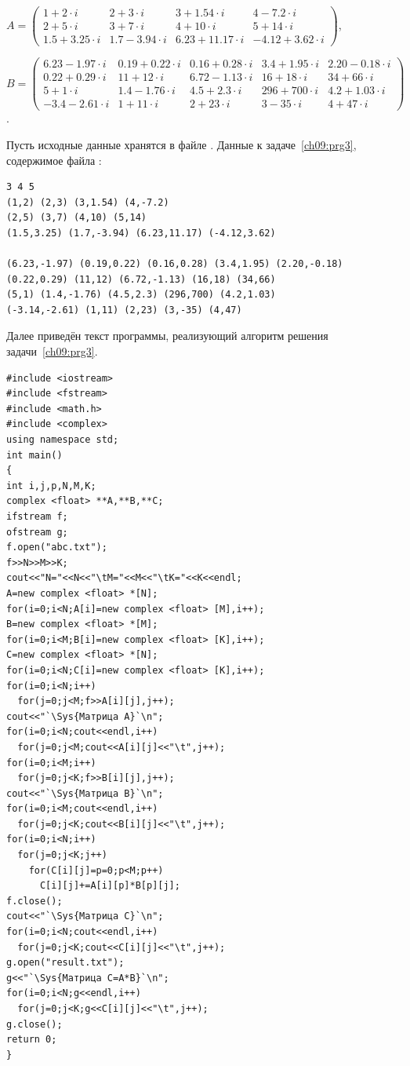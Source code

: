 {\noindent\scriptsize
$A=\left(\begin{array}{rrrr}1+2\cdot i&2+3\cdot i&3+1.54\cdot i&4-7.2\cdot i\\2+5\cdot i&3+7\cdot i&4+10\cdot i&5+14\cdot
i\\1.5+3.25\cdot i&1.7-3.94\cdot i&6.23+11.17\cdot i&-4.12+3.62\cdot i\end{array}\right)$,

\noindent $B=\left(\begin{array}{rrrrr}6.23-1.97\cdot i&0.19+0.22\cdot i&0.16+0.28\cdot i&3.4+1.95\cdot i&2.20-0.18\cdot
i\\0.22+0.29\cdot i&11+12\cdot i&6.72-1.13\cdot i&16+18\cdot i&34+66\cdot i\\5+1\cdot i&1.4-1.76\cdot i&4.5+2.3\cdot
i&296+700\cdot i&4.2+1.03\cdot i\\-3.4-2.61\cdot i&1+11\cdot i&2+23\cdot i&3-35\cdot i&4+47\cdot i\end{array}\right)$.
}

Пусть исходные данные хранятся в файле . %
Данные к задаче~\ref{ch09:prg3}\label{ch09:file0}, содержимое файла :
\begin{verbatim}
3 4 5
(1,2) (2,3) (3,1.54) (4,-7.2)
(2,5) (3,7) (4,10) (5,14)
(1.5,3.25) (1.7,-3.94) (6.23,11.17) (-4.12,3.62)

(6.23,-1.97) (0.19,0.22) (0.16,0.28) (3.4,1.95) (2.20,-0.18)
(0.22,0.29) (11,12) (6.72,-1.13) (16,18) (34,66)
(5,1) (1.4,-1.76) (4.5,2.3) (296,700) (4.2,1.03)
(-3.14,-2.61) (1,11) (2,23) (3,-35) (4,47)
\end{verbatim}


Далее приведён текст программы, реализующий алгоритм решения задачи~\ref{ch09:prg3}. 
\begin{lstlisting}
#include <iostream>
#include <fstream>
#include <math.h>
#include <complex>
using namespace std;
int main()
{
int i,j,p,N,M,K;
complex <float> **A,**B,**C;
ifstream f;
ofstream g;
f.open("abc.txt");
f>>N>>M>>K;
cout<<"N="<<N<<"\tM="<<M<<"\tK="<<K<<endl;
A=new complex <float> *[N];
for(i=0;i<N;A[i]=new complex <float> [M],i++);
B=new complex <float> *[M];
for(i=0;i<M;B[i]=new complex <float> [K],i++);
C=new complex <float> *[N];
for(i=0;i<N;C[i]=new complex <float> [K],i++);
for(i=0;i<N;i++)
  for(j=0;j<M;f>>A[i][j],j++);
cout<<"`\Sys{Матрица A}`\n";
for(i=0;i<N;cout<<endl,i++)
  for(j=0;j<M;cout<<A[i][j]<<"\t",j++);
for(i=0;i<M;i++)
  for(j=0;j<K;f>>B[i][j],j++);
cout<<"`\Sys{Матрица B}`\n";
for(i=0;i<M;cout<<endl,i++)
  for(j=0;j<K;cout<<B[i][j]<<"\t",j++);
for(i=0;i<N;i++)
  for(j=0;j<K;j++)
    for(C[i][j]=p=0;p<M;p++)
      C[i][j]+=A[i][p]*B[p][j];
f.close();
cout<<"`\Sys{Матрица C}`\n";
for(i=0;i<N;cout<<endl,i++)
  for(j=0;j<K;cout<<C[i][j]<<"\t",j++);
g.open("result.txt");
g<<"`\Sys{Матрица C=A*B}`\n";
for(i=0;i<N;g<<endl,i++)
  for(j=0;j<K;g<<C[i][j]<<"\t",j++);
g.close();
return 0;
}
\end{lstlisting}

